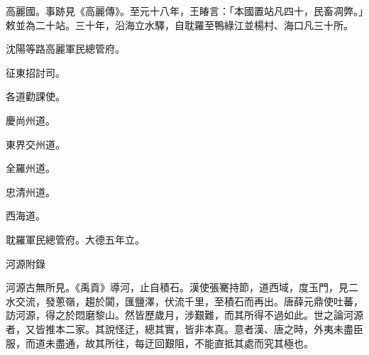 \begin{pinyinscope}
 高麗國。事跡見《高麗傳》。至元十八年，王睶言：「本國置站凡四十，民畜凋弊。」敕並為二十站。三十年，沿海立水驛，自耽羅至鴨綠江並楊村、海口凡三十所。



 沈陽等路高麗軍民總管府。



 征東招討司。



 各道勸課使。



 慶尚州道。



 東界交州道。



 全羅州道。



 忠清州道。



 西海道。



 耽羅軍民總管府。大德五年立。



 河源附錄



 河源古無所見。《禹貢》導河，止自積石。漢使張騫持節，道西域，度玉門，見二水交流，發蔥嶺，趨於闐，匯鹽澤，伏流千里，至積石而再出。唐薛元鼎使吐蕃，訪河源，得之於悶磨黎山。然皆歷歲月，涉艱難，而其所得不過如此。世之論河源者，又皆推本二家。其說怪迂，總其實，皆非本真。意者漢、唐之時，外夷未盡臣服，而道未盡通，故其所往，每迂回艱阻，不能直抵其處而究其極也。




\end{pinyinscope}
